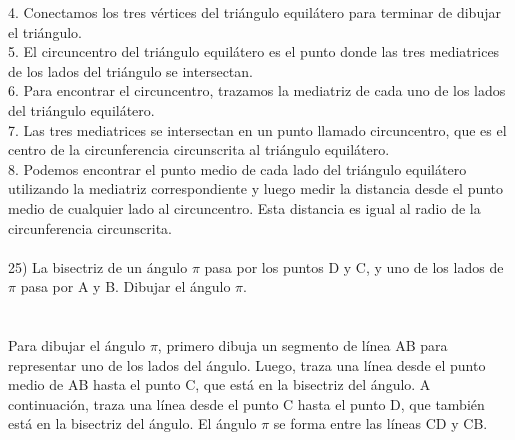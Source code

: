 \documentclass{article}
\begin{document}
4. Conectamos los tres vértices del triángulo equilátero para terminar de dibujar el triángulo.\\
5. El circuncentro del triángulo equilátero es el punto donde las tres mediatrices de los lados del triángulo se intersectan.\\
6. Para encontrar el circuncentro, trazamos la mediatriz de cada uno de los lados del triángulo equilátero.\\
7. Las tres mediatrices se intersectan en un punto llamado circuncentro, que es el centro de la circunferencia circunscrita al triángulo equilátero.\\
8. Podemos encontrar el punto medio de cada lado del triángulo equilátero utilizando la mediatriz correspondiente y luego medir la distancia desde el punto medio de cualquier lado al circuncentro. Esta distancia es igual al radio de la circunferencia circunscrita.\\
\\

25) La bisectriz de un ángulo $\pi$ pasa por los puntos D y C, y uno de los lados de $\pi$ pasa por A y B. Dibujar el ángulo $\pi$. \\
\\
\\
Para dibujar el ángulo $\pi$, primero dibuja un segmento de línea AB para representar uno de los lados del ángulo. Luego, traza una línea desde el punto medio de AB hasta el punto C, que está en la bisectriz del ángulo. A continuación, traza una línea desde el punto C hasta el punto D, que también está en la bisectriz del ángulo. El ángulo $\pi$ se forma entre las líneas CD y CB.\\ 
\end{document}
